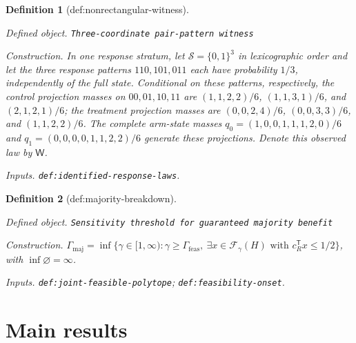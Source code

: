 \documentclass{article}
\newtheorem{definition}{Definition}
\begin{document}
\begin{definition}[def:nonrectangular-witness]\label{def:nonrectangular-witness}
\par\smallskip\noindent\emph{Defined object.} \texttt{Three-\allowbreak{}coordinate pair-\allowbreak{}pattern witness}
\par\smallskip\noindent\emph{Construction.} In one response stratum, let \(\mathcal S=\{0,1\}^3\) in lexicographic order and let the three response patterns \(110,101,011\) each have probability \(1/3\), independently of the full state. Conditional on these patterns, respectively, the control projection masses on \(00,01,10,11\) are \((1,1,2,2)/6\), \((1,1,3,1)/6\), and \((2,1,2,1)/6\); the treatment projection masses are \((0,0,2,4)/6\), \((0,0,3,3)/6\), and \((1,1,2,2)/6\). The complete arm-state masses \(q_0=(1,0,0,1,1,1,2,0)/6\) and \(q_1=(0,0,0,0,1,1,2,2)/6\) generate these projections. Denote this observed law by \(\mathsf W\).
\par\smallskip\noindent\emph{Inputs.} \texttt{def:\allowbreak{}identified-\allowbreak{}response-\allowbreak{}laws}.
\end{definition}

\begin{definition}[def:majority-breakdown]\label{def:majority-breakdown}
\par\smallskip\noindent\emph{Defined object.} \texttt{Sensitivity threshold for guaranteed majority benefit}
\par\smallskip\noindent\emph{Construction.} \(\Gamma_{\mathrm{maj}}=\inf\{\gamma\in[1,\infty):\gamma\ge\Gamma_{\mathrm{feas}},\ \exists x\in\mathcal F_{\gamma}(H)\text{ with }c_R^{\mathsf T}x\le1/2\}\), with \(\inf\varnothing=\infty\).
\par\smallskip\noindent\emph{Inputs.} \texttt{def:\allowbreak{}joint-\allowbreak{}feasible-\allowbreak{}polytope}; \texttt{def:\allowbreak{}feasibility-\allowbreak{}onset}.
\end{definition}

\section{Main results}
\end{document}
